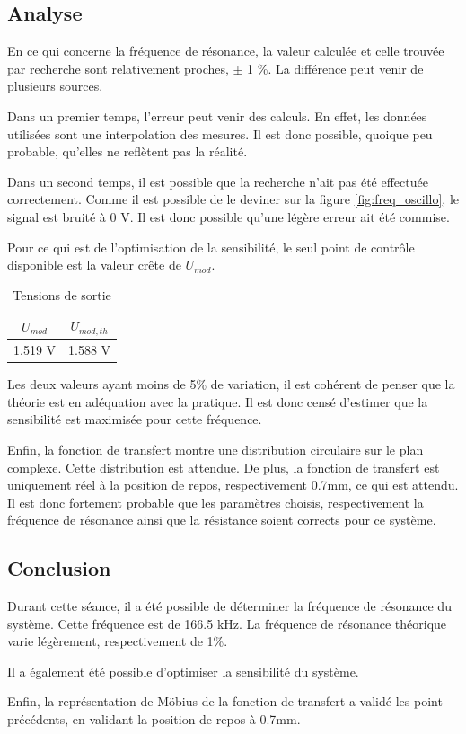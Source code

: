 \subsection{Analyse}
En ce qui concerne la fréquence de résonance, la valeur calculée et celle trouvée par recherche sont
relativement proches, $\pm$ 1 \%. La différence peut venir de plusieurs sources. 
\vspace{0,2cm}

Dans un premier temps, l'erreur
peut venir des calculs. En effet, les données utilisées sont une interpolation des mesures. Il est
donc possible, quoique peu probable, qu'elles ne reflètent pas la réalité. 
\vspace{0,2cm}

Dans un second temps, il est possible que la recherche n'ait pas été effectuée correctement. Comme
il est possible de le deviner sur la figure \ref{fig:freq_oscillo}, le signal est bruité à 0 V. Il 
est donc possible qu'une légère erreur ait été commise.
\vspace{ 0,4cm}

Pour ce qui est de l'optimisation de la sensibilité, le seul point de contrôle disponible est la 
valeur crête de $U_{mod}$.

\begin{table}[H]
    \centering
    \begin{tabular}{|c|c|}
    \hline
    $U_{mod}$     & $U_{mod,th}$  \\ \hline
    1.519 V & 1.588 V \\ \hline
    \end{tabular}
    \caption{Tensions de sortie}
    \label{tab:Umod}
\end{table} 

Les deux valeurs ayant moins de 5\% de variation, il est cohérent de penser que la théorie est en 
adéquation avec la pratique. Il est donc censé d'estimer que la sensibilité est maximisée pour cette
fréquence. 

\vspace{ 0,4cm}
Enfin, la fonction de transfert montre une distribution circulaire sur le plan complexe. 
Cette distribution est attendue. De plus, la fonction de transfert est uniquement réel à la position
de repos, respectivement 0.7mm, ce qui est attendu. Il est donc fortement probable que les paramètres
choisis, respectivement la fréquence de résonance ainsi que la résistance soient corrects pour ce
système.

\subsection{Conclusion}

Durant cette séance, il a été possible de déterminer la fréquence de résonance du système.
Cette fréquence est de 166.5 kHz. La fréquence de résonance théorique varie légèrement, respectivement
de 1\%. 

\vspace{0.2cm}
Il a également été possible d'optimiser la sensibilité du système.
\vspace{0.2cm}

Enfin, la représentation de Möbius de la fonction de transfert a validé les point précédents, en
validant la position de repos à 0.7mm.